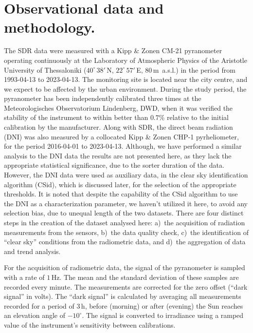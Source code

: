 \documentclass[applsci,article,submit,moreauthors,pdftex]{Definitions/mdpi}
\begin{document}
\hypertarget{observational-data-and-methodology.}{%
\section{Observational data and
methodology.}\label{observational-data-and-methodology.}}

The SDR data were measured with a Kipp \& Zonen CM-21 pyranometer
operating continuously at the Laboratory of Atmospheric Physics of the
Aristotle University of Thessaloniki (\(40^\circ\,38'\,\)N,
\(22^\circ\,57'\,\)E, \(80\,\)m~a.s.l.) in the period from 1993-04-13 to
2023-04-13. The monitoring site is located near the city centre, and we
expect to be affected by the urban environment. During the study period,
the pyranometer has been independently calibrated three times at the
Meteorologisches Observatorium Lindenberg, DWD, when it was verified the
stability of the instrument to within better than \(0.7\%\) relative to
the initial calibration by the manufacturer. Along with SDR, the direct
beam radiation (DNI) was also measured by a collocated Kipp \& Zonen
CHP-1 pyrheliometer, for the period 2016-04-01 to 2023-04-13. Although,
we have performed a similar analysis to the DNI data the results are not
presented here, as they lack the appropriate statistical significance,
due to the sorter duration of the data. However, the DNI data were used
as auxiliary data, in the clear sky identification algorithm (CSid),
which is discussed later, for the selection of the appropriate
thresholds. It is noted that despite the capability of the CSid
algorithm to use the DNI as a characterization parameter, we haven't
utilized it here, to avoid any selection bias, due to unequal length of
the two datasets. There are four distinct steps in the creation of the
dataset analysed here: a)~the acquisition of radiation measurements from
the sensors, b)~the data quality check, c)~the identification of ``clear
sky'' conditions from the radiometric data, and d)~the aggregation of
data and trend analysis.

For the acquisition of radiometric data, the signal of the pyranometer
is sampled with a rate of \(1\,\text{Hz}\). The mean and the standard
deviation of these samples are recorded every minute. The measurements
are corrected for the zero offset (``dark signal'' in volts). The ``dark
signal'' is calculated by averaging all measurements recorded for a
period of \(3\,\text{h}\), before (morning) or after (evening) the Sun
reaches an elevation angle of \(-10^\circ\). The signal is converted to
irradiance using a ramped value of the instrument's sensitivity between
calibrations.
\end{document}
